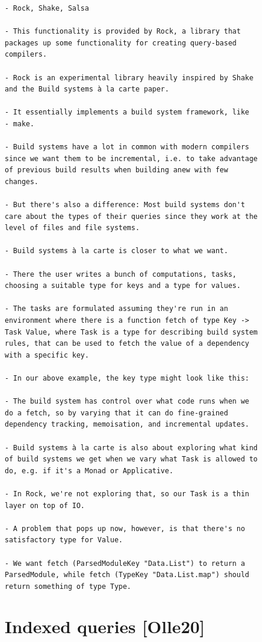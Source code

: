 \begin{verbatim}
- Rock, Shake, Salsa

- This functionality is provided by Rock, a library that
packages up some functionality for creating query-based
compilers.

- Rock is an experimental library heavily inspired by Shake
and the Build systems à la carte paper.

- It essentially implements a build system framework, like
- make.

- Build systems have a lot in common with modern compilers
since we want them to be incremental, i.e. to take advantage
of previous build results when building anew with few
changes.

- But there's also a difference: Most build systems don't
care about the types of their queries since they work at the
level of files and file systems.

- Build systems à la carte is closer to what we want.

- There the user writes a bunch of computations, tasks,
choosing a suitable type for keys and a type for values.

- The tasks are formulated assuming they're run in an
environment where there is a function fetch of type Key ->
Task Value, where Task is a type for describing build system
rules, that can be used to fetch the value of a dependency
with a specific key.

- In our above example, the key type might look like this:

- The build system has control over what code runs when we
do a fetch, so by varying that it can do fine-grained
dependency tracking, memoisation, and incremental updates.

- Build systems à la carte is also about exploring what kind
of build systems we get when we vary what Task is allowed to
do, e.g. if it's a Monad or Applicative.

- In Rock, we're not exploring that, so our Task is a thin
layer on top of IO.

- A problem that pops up now, however, is that there's no
satisfactory type for Value.

- We want fetch (ParsedModuleKey "Data.List") to return a
ParsedModule, while fetch (TypeKey "Data.List.map") should
return something of type Type.
\end{verbatim}
\cite{olle_query_based}

\section*{Indexed queries [Olle20]}

